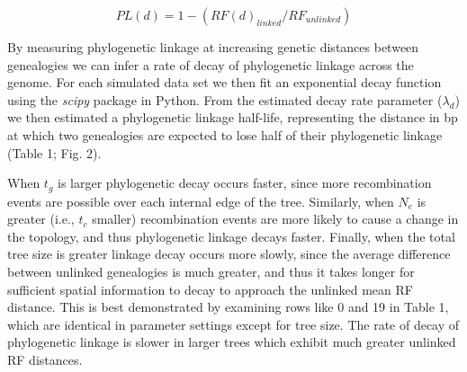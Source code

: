 \documentclass[11pt]{article}
\begin{document}
$$ PL(d) = 1 - (RF(d)_{linked} / RF_{unlinked}) $$

By measuring phylogenetic linkage at increasing genetic distances between genealogies we can infer a rate of decay of phylogenetic linkage across the genome. For each simulated data set we then fit an exponential decay function using the \emph{scipy} package in Python. From the estimated decay rate parameter ($\lambda_d$) we then estimated a phylogenetic linkage half-life, representing the distance in bp at which two genealogies are expected to lose half of their phylogenetic linkage (Table 1; Fig. 2). 

When $t_g$ is larger phylogenetic decay occurs faster, since more recombination events are possible over each internal edge of the tree. Similarly, when $N_e$ is greater (i.e., $t_c$ smaller) recombination events are more likely to cause a change in the topology, and thus phylogenetic linkage decays faster. Finally, when the total tree size is greater linkage decay occurs more slowly, since the average difference between unlinked genealogies is much greater, and thus it takes longer for sufficient spatial information to decay to approach the unlinked mean RF distance. This is best demonstrated by examining rows like 0 and 19 in Table 1, which are identical in parameter settings except for tree size. The rate of decay of phylogenetic linkage is slower in larger trees which exhibit much greater unlinked RF distances.

\end{document}

